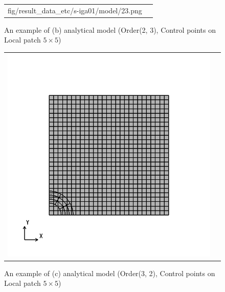 \begin{figure}[htbp]
\begin{tabular}{cc}
\begin{minipage}[t]{0.45\hsize}
      {fig/result_data_etc/s-iga01/model/23.png}
      \caption{An example of (b) analytical model (Order(2, 3), Control points on Local patch $5\times 5$)}
      \label{fig:23}
    \end{minipage}
  \end{tabular}
\end{figure}

\newpage

\begin{figure}[htbp]
  \begin{tabular}{cc}
    \begin{minipage}[t]{0.45\hsize}
      \centering
      \includegraphics[keepaspectratio, scale=0.3]
      {fig/result_data_etc/s-iga01/model/32.png}
      \caption{An example of (c) analytical model (Order(3, 2), Control points on Local patch $5\times 5$)}
      \label{fig:32}
    \end{minipage} &
    \begin{minipage}[t]{0.45\hsize}
      \centering

\end{minipage}
\end{tabular}
\end{figure}
